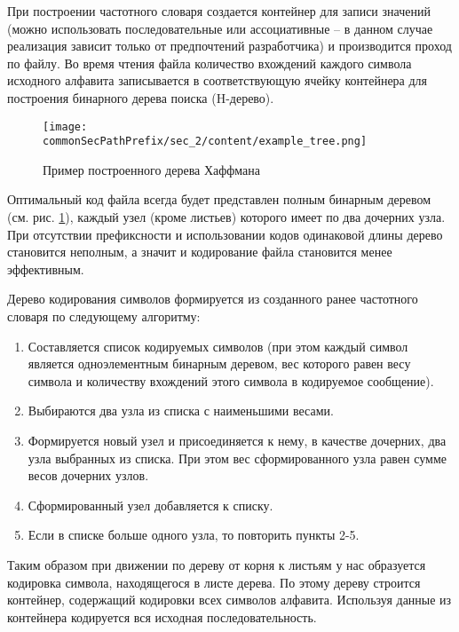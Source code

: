 При построении частотного словаря создается контейнер для записи значений (можно использовать последовательные или ассоциативные -- в данном случае реализация зависит только от предпочтений разработчика) и производится проход по файлу.
Во время чтения файла количество вхождений каждого символа исходного алфавита записывается в соответствующую ячейку контейнера для построения бинарного дерева поиска (H-дерево).

\begin{figure}[h]
    \centering
    \texttt{[image: \\commonSecPathPrefix/sec\_2/content/example\_tree.png]}
    \caption{Пример построенного дерева Хаффмана}
    \label{fig:exmple_htree}
\end{figure}



Оптимальный код файла всегда будет представлен полным бинарным деревом (см. рис. \ref{fig:exmple_htree}), каждый узел (кроме листьев) которого имеет по два дочерних узла.
При отсутствии префиксности и использовании кодов одинаковой длины дерево становится неполным, а значит и кодирование файла становится менее эффективным.



Дерево кодирования символов формируется из созданного ранее частотного словаря по следующему алгоритму:
\begin{enumerate}
    \item[1] Составляется список кодируемых символов (при этом каждый символ является одноэлементным бинарным деревом, вес которого равен весу символа и количеству вхождений этого символа в кодируемое сообщение).    
    \item[2] Выбираются два узла из списка с наименьшими весами.
    \item[3] Формируется новый узел и присоединяется к нему, в качестве дочерних, два узла выбранных из списка. При этом вес сформированного узла равен сумме весов дочерних узлов.
    \item[4] Сформированный узел добавляется к списку.
    \item[5] Если в списке больше одного узла, то повторить пункты 2-5.
\end{enumerate}



Таким образом при движении по дереву от корня к листьям у нас образуется кодировка символа, находящегося в листе дерева.
По этому дереву строится контейнер, содержащий кодировки всех символов алфавита.
Используя данные из контейнера кодируется вся исходная последовательность.



